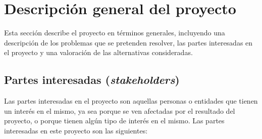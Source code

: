 \chapter{Descripción general del proyecto}\label{chap:desc}
Esta sección describe el proyecto en términos generales, incluyendo una
descripción de los problemas que se pretenden resolver, las partes interesadas
en el proyecto y una valoración de las alternativas consideradas.


\section{Partes interesadas (\textit{stakeholders})}\label{sec:stakeholders}
Las partes interesadas en el proyecto son aquellas personas o entidades que
tienen un interés en el mismo, ya sea porque se ven afectadas por el resultado
del proyecto, o porque tienen algún tipo de interés en el mismo. Las partes
interesadas en este proyecto son las siguientes:

